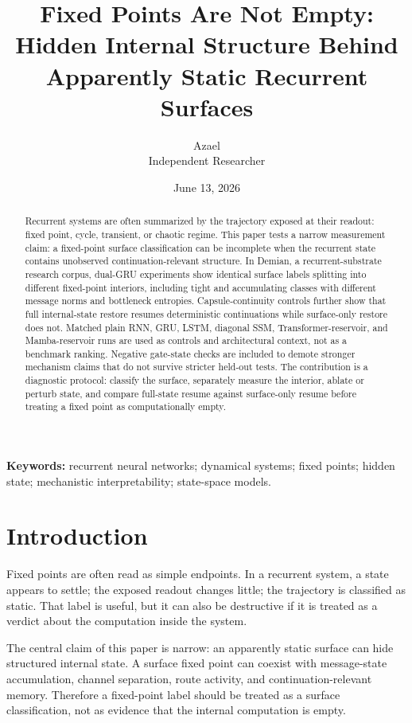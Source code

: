 \documentclass[11pt]{article}
\title{Fixed Points Are Not Empty:\\Hidden Internal Structure Behind Apparently Static Recurrent Surfaces}
\author{Azael\\Independent Researcher}
\date{June 13, 2026}
\begin{document}
\maketitle

\begin{abstract}
Recurrent systems are often summarized by the trajectory exposed at their
readout: fixed point, cycle, transient, or chaotic regime. This paper tests a
narrow measurement claim: a fixed-point surface classification can be
incomplete when the recurrent state contains unobserved continuation-relevant
structure. In Demian, a recurrent-substrate research corpus, dual-GRU
experiments show identical surface labels splitting into different fixed-point
interiors, including tight and accumulating classes with different message
norms and bottleneck entropies. Capsule-continuity controls further show that
full internal-state restore resumes deterministic continuations while
surface-only restore does not. Matched plain RNN, GRU, LSTM, diagonal SSM,
Transformer-reservoir, and Mamba-reservoir runs are used as controls and
architectural context, not as a benchmark ranking. Negative gate-state checks
are included to demote stronger mechanism claims that do not survive stricter
held-out tests. The contribution is a diagnostic protocol: classify the
surface, separately measure the interior, ablate or perturb state, and compare
full-state resume against surface-only resume before treating a fixed point as
computationally empty.
\end{abstract}

\noindent\textbf{Keywords:} recurrent neural networks; dynamical systems;
fixed points; hidden state; mechanistic interpretability; state-space models.

\section{Introduction}

Fixed points are often read as simple endpoints. In a recurrent system, a
state appears to settle; the exposed readout changes little; the trajectory is
classified as static. That label is useful, but it can also be destructive if
it is treated as a verdict about the computation inside the system.

The central claim of this paper is narrow: an apparently static surface can
hide structured internal state. A surface fixed point can coexist with
message-state accumulation, channel separation, route activity, and
continuation-relevant memory. Therefore a fixed-point label should be treated
as a surface classification, not as evidence that the internal computation is
empty.
\end{document}
